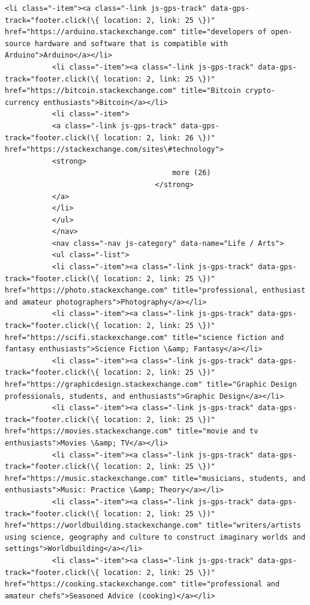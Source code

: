\documentclass[11pt]{article}
\begin{document}
\begin{Verbatim}[commandchars=\\\{\}]
           <li class="-item"><a class="-link js-gps-track" data-gps-track="footer.click(\{ location: 2, link: 25 \})" href="https://arduino.stackexchange.com" title="developers of open-source hardware and software that is compatible with Arduino">Arduino</a></li>
           <li class="-item"><a class="-link js-gps-track" data-gps-track="footer.click(\{ location: 2, link: 25 \})" href="https://bitcoin.stackexchange.com" title="Bitcoin crypto-currency enthusiasts">Bitcoin</a></li>
           <li class="-item">
           <a class="-link js-gps-track" data-gps-track="footer.click(\{ location: 2, link: 26 \})" href="https://stackexchange.com/sites\#technology">
           <strong>
                                       more (26)
                                   </strong>
           </a>
           </li>
           </ul>
           </nav>
           <nav class="-nav js-category" data-name="Life / Arts">
           <ul class="-list">
           <li class="-item"><a class="-link js-gps-track" data-gps-track="footer.click(\{ location: 2, link: 25 \})" href="https://photo.stackexchange.com" title="professional, enthusiast and amateur photographers">Photography</a></li>
           <li class="-item"><a class="-link js-gps-track" data-gps-track="footer.click(\{ location: 2, link: 25 \})" href="https://scifi.stackexchange.com" title="science fiction and fantasy enthusiasts">Science Fiction \&amp; Fantasy</a></li>
           <li class="-item"><a class="-link js-gps-track" data-gps-track="footer.click(\{ location: 2, link: 25 \})" href="https://graphicdesign.stackexchange.com" title="Graphic Design professionals, students, and enthusiasts">Graphic Design</a></li>
           <li class="-item"><a class="-link js-gps-track" data-gps-track="footer.click(\{ location: 2, link: 25 \})" href="https://movies.stackexchange.com" title="movie and tv enthusiasts">Movies \&amp; TV</a></li>
           <li class="-item"><a class="-link js-gps-track" data-gps-track="footer.click(\{ location: 2, link: 25 \})" href="https://music.stackexchange.com" title="musicians, students, and enthusiasts">Music: Practice \&amp; Theory</a></li>
           <li class="-item"><a class="-link js-gps-track" data-gps-track="footer.click(\{ location: 2, link: 25 \})" href="https://worldbuilding.stackexchange.com" title="writers/artists using science, geography and culture to construct imaginary worlds and settings">Worldbuilding</a></li>
           <li class="-item"><a class="-link js-gps-track" data-gps-track="footer.click(\{ location: 2, link: 25 \})" href="https://cooking.stackexchange.com" title="professional and amateur chefs">Seasoned Advice (cooking)</a></li>

\end{Verbatim}
\end{document}

